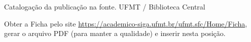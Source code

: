 %
%

\newpage

\begin{center}

\vspace*{\fill}

Catalogação da publicação na fonte.
UFMT / Biblioteca Central

Obter a Ficha pelo site \url{https://academico-siga.ufmt.br/ufmt.sfc/Home/Ficha}, gerar o arquivo PDF (para manter a qualidade) e inserir nesta posição.

\end{center}
